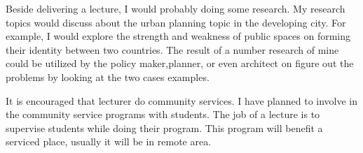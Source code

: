 \documentclass[../main.tex]{subfiles}
\begin{document}
Beside delivering a lecture, I would probably doing some research. My research topics would discuss about the urban planning topic in the developing city. For example, I would explore the strength and weakness of public spaces on forming their identity between two countries. The result of a number research of mine could be utilized by the policy maker,planner, or even architect on figure out the problems by looking at the two cases examples.

It is encouraged that lecturer do community services. I have planned to involve in the community service programs with students. The job of a lecture is to supervise students while doing their program. This program will benefit a serviced place, usually it will be in remote area.


%

%
\end{document}

